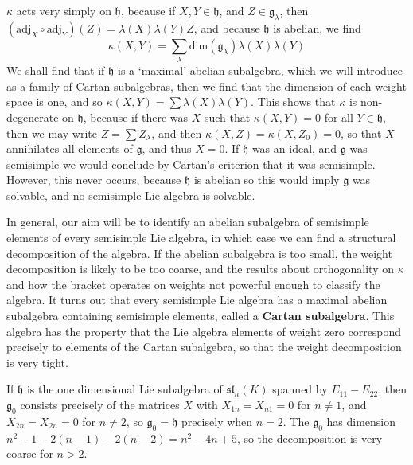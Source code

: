 $\kappa$ acts very simply on $\mathfrak{h}$, because if $X,Y \in \mathfrak{h}$, and $Z \in \mathfrak{g}_\lambda$, then $(\text{adj}_X \circ \text{adj}_Y)(Z) = \lambda(X) \lambda(Y) Z$, and because $\mathfrak{h}$ is abelian, we find
%
\[ \kappa(X,Y) = \sum_\lambda \text{dim}(\mathfrak{g}_\lambda) \lambda(X) \lambda(Y) \]
%
We shall find that if $\mathfrak{h}$ is a `maximal' abelian subalgebra, which we will introduce as a family of Cartan subalgebras, then we find that the dimension of each weight space is one, and so $\kappa(X,Y) = \sum \lambda(X) \lambda(Y)$. This shows that $\kappa$ is non-degenerate on $\mathfrak{h}$, because if there was $X$ such that $\kappa(X,Y) = 0$ for all $Y \in \mathfrak{h}$, then we may write $Z = \sum Z_\lambda$, and then $\kappa(X,Z) = \kappa(X,Z_0) = 0$, so that $X$ annihilates all elements of $\mathfrak{g}$, and thus $X = 0$. If $\mathfrak{h}$ was an ideal, and $\mathfrak{g}$ was semisimple we would conclude by Cartan's criterion that it was semisimple. However, this never occurs, because $\mathfrak{h}$ is abelian so this would imply $\mathfrak{g}$ was solvable, and no semisimple Lie algebra is solvable.

In general, our aim will be to identify an abelian subalgebra of semisimple elements of every semisimple Lie algebra, in which case we can find a structural decomposition of the algebra. If the abelian subalgebra is too small, the weight decomposition is likely to be too coarse, and the results about orthogonality on $\kappa$ and how the bracket operates on weights not powerful enough to classify the algebra. It turns out that every semisimple Lie algebra has a maximal abelian subalgebra containing semisimple elements, called a {\bf Cartan subalgebra}. This algebra has the property that the Lie algebra elements of weight zero correspond precisely to elements of the Cartan subalgebra, so that the weight decomposition is very tight.

\begin{example}
    If $\mathfrak{h}$ is the one dimensional Lie subalgebra of $\mathfrak{sl}_n(K)$ spanned by $E_{11} - E_{22}$, then $\mathfrak{g}_0$ consists precisely of the matrices $X$ with $X_{1n} = X_{n1} = 0$ for $n \neq 1$, and $X_{2n} = X_{2n} = 0$ for $n \neq 2$, so $\mathfrak{g}_0 = \mathfrak{h}$ precisely when $n = 2$. The $\mathfrak{g}_0$ has dimension $n^2 - 1 - 2(n-1) - 2(n-2) = n^2 - 4n + 5$, so the decomposition is very coarse for $n > 2$.
\end{example}

